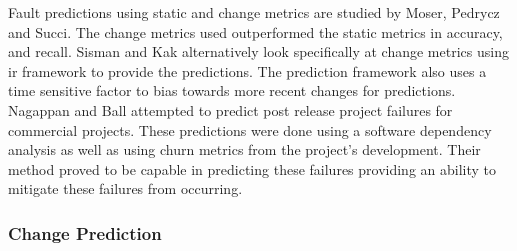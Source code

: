 Fault predictions using static and change metrics are studied by Moser, Pedrycz and Succi\cite{Moser2008}. The change metrics used outperformed the static metrics in accuracy, and recall. Sisman and Kak alternatively look specifically at change metrics using \gls{ir} framework to provide the predictions. The prediction framework also uses a time sensitive factor to bias towards more recent changes for predictions. Nagappan and Ball attempted to predict post release project failures for commercial projects. These predictions were done using a software dependency analysis as well as using churn metrics from the project's development. Their method proved to be capable in predicting these failures providing an ability to mitigate these failures from occurring.







\subsubsection{Change Prediction}

